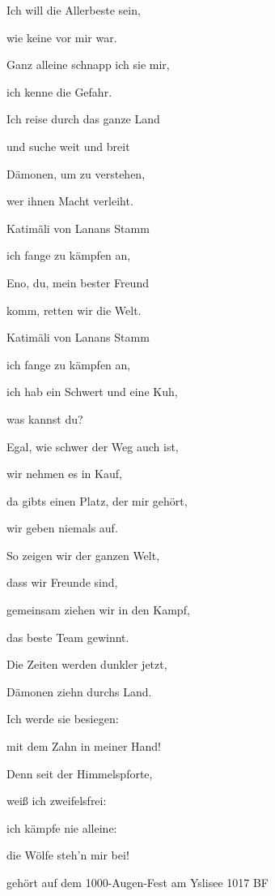 \begin{center}
{\small
Ich will die Allerbeste sein, 

wie keine vor mir war. 

Ganz alleine schnapp ich sie mir, 

ich kenne die Gefahr. 

\smallskip

Ich reise durch das ganze Land

und suche weit und breit

 Dämonen, um zu verstehen, 

wer ihnen Macht verleiht. 

\bigskip

Katimäli von Lanans Stamm

ich fange zu kämpfen an, 

Eno, du, mein bester Freund

komm, retten wir die Welt. 

\smallskip

Katimäli von Lanans Stamm

ich fange zu kämpfen an, 

ich hab ein Schwert und eine Kuh, 

was kannst du?

\bigskip

Egal, wie schwer der Weg auch ist, 

wir nehmen es in Kauf, 

da gibts einen Platz, der mir gehört, 

wir geben niemals auf. 

\smallskip

So zeigen wir der ganzen Welt, 

dass wir Freunde sind, 

gemeinsam ziehen wir in den Kampf, 

das beste Team gewinnt.

\bigskip

Die Zeiten werden dunkler jetzt, 

Dämonen ziehn durchs Land. 

Ich werde sie besiegen:

mit dem Zahn in meiner Hand!

\smallskip

Denn seit der Himmelspforte, 

weiß ich zweifelsfrei: 

ich kämpfe nie alleine: 

die Wölfe steh'n mir bei!
}
\vfill

 gehört auf dem 1000-Augen-Fest am Yslisee 1017 BF
\end{center}

